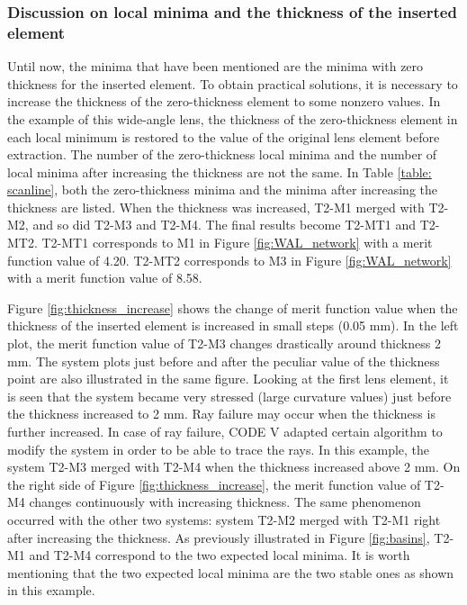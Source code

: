 \subsubsection{Discussion on local minima and the thickness of the inserted element}
Until now, the minima that have been mentioned are the minima with zero thickness for the inserted element. To obtain practical solutions, it is necessary to increase the thickness of the zero-thickness element to some nonzero values. In the example of this wide-angle lens, the thickness of the zero-thickness element in each local minimum is restored to the value of the original lens element before extraction. The number of the zero-thickness local minima and the number of local minima after increasing the thickness are not the same. In Table \ref{table: scanline}, both the zero-thickness minima and the minima after increasing the thickness are listed. When the thickness was increased, T2-M1 merged with T2-M2, and so did T2-M3 and T2-M4. The final results become T2-MT1 and T2-MT2. T2-MT1 corresponds to M1 in Figure \ref{fig:WAL_network} with a merit function value of 4.20. T2-MT2 corresponds to M3 in Figure \ref{fig:WAL_network} with a merit function value of 8.58. 

Figure \ref{fig:thickness_increase} shows the change of merit function value when the thickness of the inserted element is increased in small steps (0.05 mm). In the left plot, the merit function value of T2-M3 changes drastically around thickness 2 mm. The system plots just before and after the peculiar value of  the thickness point are also illustrated in the same figure. Looking at the first lens element, it is seen that the system became very stressed (large curvature values) just before the thickness increased to 2 mm. Ray failure may occur when the thickness is further increased. In case of ray failure, CODE V adapted certain algorithm to modify the system in order to be able to trace the rays. In this example, the system T2-M3 merged with T2-M4 when the thickness increased above 2 mm. On the right side of Figure \ref{fig:thickness_increase}, the merit function value of T2-M4 changes continuously with increasing thickness. The same phenomenon occurred with the other two systems: system T2-M2 merged with T2-M1 right after increasing the thickness. As previously illustrated in Figure \ref{fig:basins}, T2-M1 and T2-M4 correspond to the two expected local minima. It is worth mentioning that the two expected local minima are the two stable ones as shown in this example.
